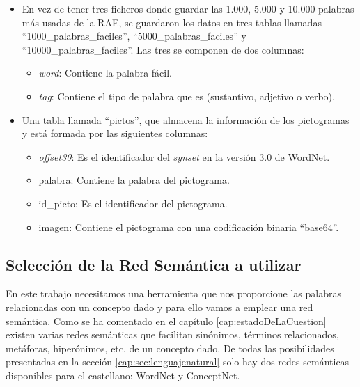 \begin{itemize}
	\item En vez de tener tres ficheros donde guardar las 1.000, 5.000 y 10.000 palabras más usadas de la RAE, se guardaron los datos en tres tablas llamadas ``1000\_palabras\_faciles'', ``5000\_palabras\_faciles'' y ``10000\_palabras\_faciles''. Las tres se componen de dos columnas:
	\begin{itemize}
		\item \textit{word}: Contiene la palabra fácil.  
		\item \textit{tag}: Contiene el tipo de palabra que es (sustantivo, adjetivo o verbo).
	\end{itemize} 
	 
	 
	\item Una tabla llamada ``pictos'', que almacena la información de los pictogramas y está formada por las siguientes columnas:
	\begin{itemize}
		\item \textit{offset30}: Es el identificador del \textit{synset} en la versión 3.0 de WordNet.
		\item palabra: Contiene la palabra del pictograma.
		\item id\_picto: Es el identificador del pictograma.
		\item imagen: Contiene el pictograma con una codificación binaria ``base64''.
	\end{itemize}

\end{itemize}

\subsection{Selección de la Red Semántica a utilizar}
\label{cap:subsec:redsemanticautilizada}

En este trabajo necesitamos una herramienta que nos proporcione las palabras relacionadas con un concepto dado y para ello vamos a emplear una red semántica.
Como se ha comentado en el capítulo \ref{cap:estadoDeLaCuestion} existen varias redes semánticas que facilitan sinónimos, términos relacionados, metáforas, hiperónimos, etc. de un concepto dado. 
De todas las posibilidades presentadas en la sección \ref{cap:sec:lenguajenatural} solo hay dos redes semánticas disponibles para el castellano: WordNet y ConceptNet. 


